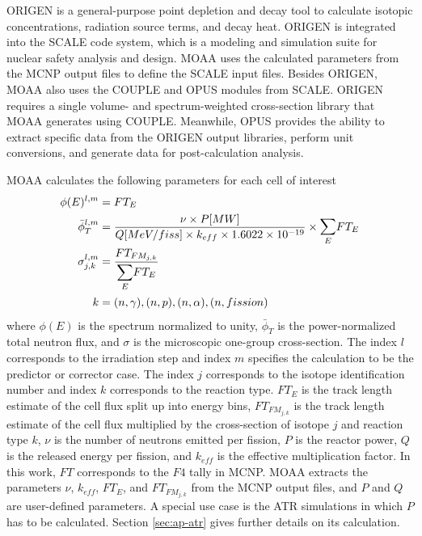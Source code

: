 ORIGEN is a general-purpose point depletion and decay tool to calculate isotopic concentrations, radiation source terms, and decay heat.
ORIGEN is integrated into the SCALE code system, which is a modeling and simulation suite for nuclear safety analysis and design.
MOAA uses the calculated parameters from the MCNP output files to define the SCALE input files.
Besides ORIGEN, MOAA also uses the COUPLE and OPUS modules from SCALE.
ORIGEN requires a single volume- and spectrum-weighted cross-section library that MOAA generates using COUPLE.
Meanwhile, OPUS provides the ability to extract specific data from the ORIGEN output libraries, perform unit conversions, and generate data for post-calculation analysis.

MOAA calculates the following parameters for each cell of interest
\begin{align}
\phi(E)^{l, m} &= FT_{E} \\
\bar{\phi}_T^{l, m} &= \frac{\nu \times P [MW]}{Q [MeV/fiss] \times k_{eff} \times 1.6022 \times 10^{-19}} \times \mathlarger{\sum}_E FT_E \label{eq-flux} \\
\sigma_{j,k}^{l, m} &= \frac{ FT_{FM_{j,k}} }{ \mathlarger{\sum}_E FT_E } \\  %
k &= (n,\gamma), (n,p), (n,\alpha), (n,fission)
\end{align}
where $\phi(E)$ is the spectrum normalized to unity, $\bar{\phi}_T$ is the power-normalized total neutron flux, and $\sigma$ is the microscopic one-group cross-section.
The index $l$ corresponds to the irradiation step and index $m$ specifies the calculation to be the predictor or corrector case.
The index $j$ corresponds to the isotope identification number and index $k$ corresponds to the reaction type.
$FT_E$ is the track length estimate of the cell flux split up into energy bins, $FT_{FM_{j,k}}$ is the track length estimate of the cell flux multiplied by the cross-section of isotope $j$ and reaction type $k$, $\nu$ is the number of neutrons emitted per fission, $P$ is the reactor power, $Q$ is the released energy per fission, and $k_{eff}$ is the effective multiplication factor.
In this work, $FT$ corresponds to the $F4$ tally in MCNP.
MOAA extracts the parameters $\nu$, $k_{eff}$, $FT_E$, and $FT_{FM_{j,k}}$ from the MCNP output files, and $P$ and $Q$ are user-defined parameters.
A special use case is the ATR simulations in which $P$ has to be calculated.
Section \ref{sec:ap-atr} gives further details on its calculation.

